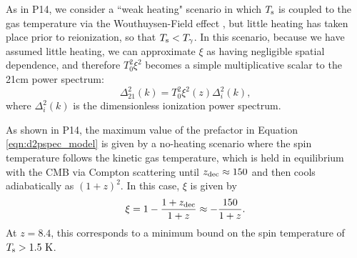 \documentclass[twocolumn,numberedappendix]{emulateapj} \shorttitle{New Limits on the 21 cm Power Spectrum at $z=8.4$}
\newcommand{\Tspin}{T_{\rm s}}
\newcommand{\Tcmb}{T_\gamma}
\begin{document}
As in P14,
we consider a ``weak heating" scenario in which $\Tspin$ is coupled to the gas temperature via
the Wouthuysen-Field effect \citep{wouthuysen1952,field1958,hirata2006},
but little heating has taken place prior to reionization, so that $\Tspin<\Tcmb$.
In this scenario, 
because we have assumed little heating, we can approximate $\xi$ as having negligible spatial
dependence, and therefore $T_0^2\xi^2$ becomes a simple multiplicative scalar to the 
21cm power spectrum:
\begin{equation}\label{eqn:d2pspec_model}
    \Delta^2_{21}(k) = T_0^2\xi^2(z)\Delta_{i}^{2}(k),%
\end{equation}
where $\Delta_{i}^{2}(k)$ is the dimensionless ionization power spectrum. 

As shown in P14, the maximum value of the
prefactor in Equation \eqref{eqn:d2pspec_model} is given by 
a no-heating scenario where the spin temperature follows the kinetic gas temperature,
which is held in equilibrium with the CMB via Compton scattering until $z_{\rm dec}\approx150$
\citep{furlanetto_et_al2006} and then cools adiabatically
as $(1+z)^2$.
In this case, $\xi$ is given by
\begin{equation}\label{eqn:maxxi}
\xi = 1 -\frac{1+z_{\rm dec}}{1+z} \approx -\frac{150}{1+z}.
\end{equation}
At $z=8.4$, this corresponds to a minimum bound on the spin temperature of $\Tspin>1.5~{\rm K}$.
\end{document}
